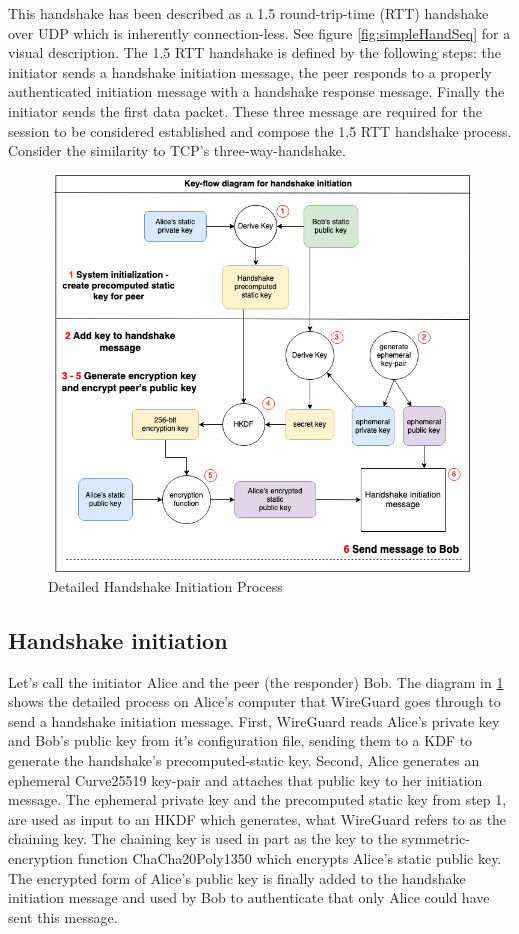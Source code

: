 \documentclass [11pt, proquest] {uwthesis}[2020/02/24]
\begin{document}
This handshake has been described as a 1.5 round-trip-time (RTT) handshake over UDP which is inherently connection-less. See figure \ref{fig:simpleHandSeq} for a visual description.  The 1.5 RTT handshake is defined by the following steps: the initiator sends a handshake initiation message, the peer responds to a properly authenticated initiation message with a handshake response message. Finally the initiator sends the first data packet. These three message are required for the session to be considered established and compose the 1.5 RTT handshake process. Consider the similarity to TCP's three-way-handshake.
\begin{figure}[H]
\includegraphics[width=16cm]{paper/images/key-flow-wg.png}
\caption{Detailed Handshake Initiation Process}
\label{fig:keyflow}
\end{figure}
\subsection{Handshake initiation}
\label{handinit}
Let's call the initiator Alice and the peer (the responder) Bob.
The diagram in \ref{fig:keyflow} shows the detailed process on Alice's computer that WireGuard goes through to send a handshake initiation message. First, WireGuard reads Alice's private key and Bob's public key from it's configuration file, sending them to a KDF to generate the handshake's precomputed-static key. Second, Alice generates an ephemeral Curve25519 key-pair and attaches that public key to her initiation message. The ephemeral private key and the precomputed static key from step 1, are used as input to an HKDF which generates, what WireGuard refers to as the chaining key. The chaining key is used in part as the key to the symmetric-encryption function ChaCha20Poly1350 which encrypts Alice's static public key. The encrypted form of Alice's public key is finally added to the handshake initiation message and used by Bob to authenticate that only Alice could have sent this message.
\end{document}
